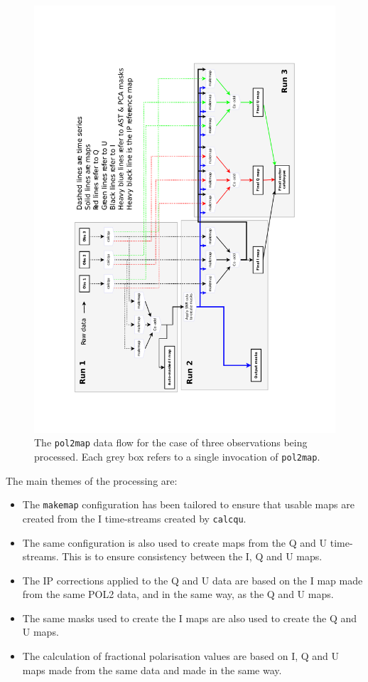 \documentclass[twoside,11pt]{starlink}
\begin{document}
\begin{figure}
\includegraphics[width=.99\linewidth]{pol2map_flow.pdf}
\caption{The \texttt{pol2map} data flow for the case of three
observations being processed. Each grey box refers to a single invocation
of \texttt{pol2map}.}
\label{fig:flow}
\end{figure}

The main themes of the processing are:

\begin{itemize}
\item The \texttt{makemap} configuration has been tailored to ensure that
usable maps are created from the I time-streams created by \texttt{calcqu}.
\item The same configuration is also used to create maps from the Q and U
time-streams. This is to ensure consistency between the I, Q and U maps.
\item The IP corrections applied to the Q and U data are based on the I
map made from the same POL2 data, and in the same way, as the Q and U maps.
\item The same masks used to create the I maps are also used to create
the Q and U maps.
\item The calculation of fractional polarisation values are based on I, Q
and U maps made from the same data and made in the same way.
\end{itemize}
\end{document}
